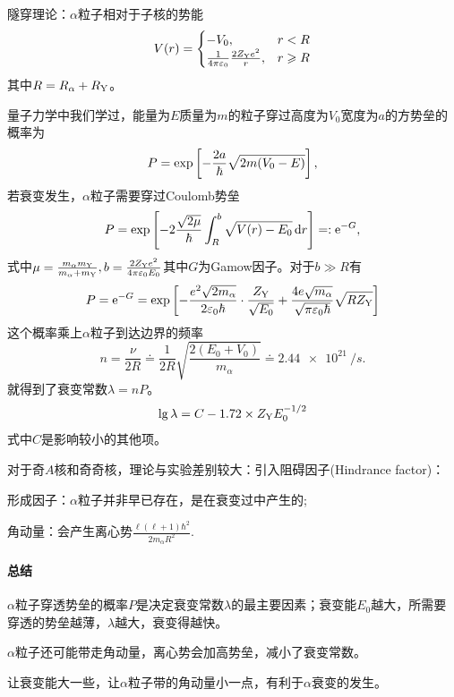 隧穿理论：$\alpha$粒子相对于子核的势能
\begin{align}
	V(r)=\begin{cases}
		-V_0,&r<R\\
		\frac1{4\pi\varepsilon_0}\frac{2Z_{\mathrm{Y}}e^2}r,&r\geqslant R
	\end{cases}
\end{align}
其中$R=R_\alpha+R_{\mathrm{Y}}$。
\begin{center}
\end{center}
量子力学中我们学过，能量为$E$质量为$m$的粒子穿过高度为$V_0$宽度为$a$的方势垒的概率为
\[
	P=\exp\left[-\frac{2a}\hbar\sqrt{2m(V_0-E)}\right],
\]
若衰变发生，$\alpha$粒子需要穿过Coulomb势垒
\[
	P=\exp\left[-2\frac{\sqrt{2\mu}}\hbar\int_R^b\sqrt{V(r)-E_0}\mathop{}\!\mathrm{d} r\right]=:\mathop{}\!\mathrm{e}^{-G},
\]
式中$\mu=\frac{m_\alpha m_{\mathrm{Y}}}{m_\alpha+m_{\mathrm{Y}}},b=\frac{2Z_{\mathrm{Y}}e^2}{4\pi\varepsilon_0 E_0}$其中$G$为Gamow因子。对于$b\gg R$有
\[
	P=\mathop{}\!\mathrm{e}^{-G}=\exp\left[-\frac{e^2\sqrt{2m_\alpha}}{2\varepsilon_0\hbar}\cdot\frac{Z_{\mathrm{Y}}}{\sqrt{E_0}}+\frac{4e\sqrt{m_\alpha }}{\sqrt{\pi\varepsilon_0\hbar}}\sqrt{RZ_{\mathrm{Y}}}\right]
\]
这个概率乘上$\alpha$粒子到达边界的频率
\[
	n=\frac{\nu}{2R}\doteq\frac1{2R}\sqrt{\frac{2(E_0+V_0)}{m_\alpha}}\doteq\SI{2.44e21}{/s}.
\]
就得到了衰变常数$\lambda=nP$。
\begin{align}
	\lg\lambda=C-1.72\times Z_{\mathrm{Y}}E_0^{-1/2}
\end{align}
式中$C$是影响较小的其他项。

对于奇$A$核和奇奇核，理论与实验差别较大：引入阻碍因子(Hindrance factor)：
\begin{compactenum}
	\item 形成因子：$\alpha$粒子并非早已存在，是在衰变过中产生的;
	\item 角动量：会产生离心势$\frac{\ell(\ell+1)\hbar^2}{2m_\alpha R^2}.$
\end{compactenum}
\paragraph{总结}
\begin{compactenum}
	\item $\alpha$粒子穿透势垒的概率$P$是决定衰变常数$\lambda$的最主要因素；衰变能$E_0$越大，所需要穿透的势垒越薄，$\lambda$越大，衰变得越快。
	\item $\alpha$粒子还可能带走角动量，离心势会加高势垒，减小了衰变常数。
\end{compactenum}
让衰变能大一些，让$\alpha$粒子带的角动量小一点，有利于$\alpha$衰变的发生。

